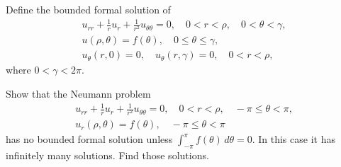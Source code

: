\begin{exerciselist}
\item\label{exer:12.4.6}Define the bounded formal solution of
\begin{gather*}
u_{rr}+\frac{1}{r}u_r+\frac{1}{r^2}u_{\theta\theta}=0,\quad
0<r<\rho,\quad 0<\theta<\gamma,\\
  u(\rho,\theta)=f(\theta),\quad
0\le\theta\le\gamma,\\
u_\theta(r,0)=0,\quad u_\theta(r,\gamma)=0,\quad 0<r<\rho,
\end{gather*}
where $0<\gamma<2\pi$.

\item\label{exer:12.4.7}Show that the Neumann problem
\begin{gather*}
u_{rr}+\frac{1}{r}u_r+\frac{1}{r^2}u_{\theta\theta}=0,\quad
0<r<\rho,\quad -\pi\le\theta<\pi,\\
u_r(\rho,\theta)=f(\theta),\quad -\pi\le\theta<\pi
\end{gather*}
has no bounded formal solution unless $\int_{-\pi}^\pi
f(\theta)\,d\theta=0$.   In this case it has infinitely many
solutions. Find those solutions.


\end{exerciselist}
